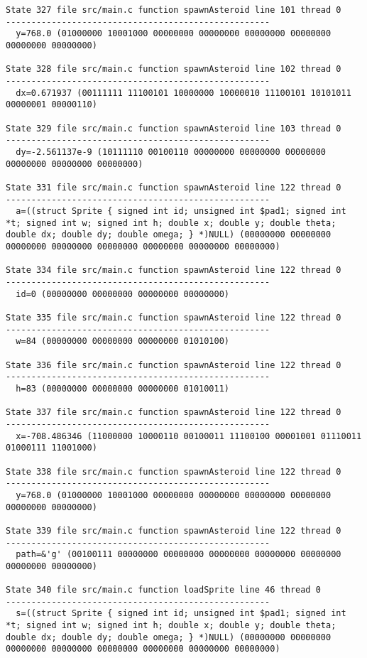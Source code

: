 \begin{verbatim}
State 327 file src/main.c function spawnAsteroid line 101 thread 0
----------------------------------------------------
  y=768.0 (01000000 10001000 00000000 00000000 00000000 00000000 00000000 00000000)

State 328 file src/main.c function spawnAsteroid line 102 thread 0
----------------------------------------------------
  dx=0.671937 (00111111 11100101 10000000 10000010 11100101 10101011 00000001 00000110)

State 329 file src/main.c function spawnAsteroid line 103 thread 0
----------------------------------------------------
  dy=-2.561137e-9 (10111110 00100110 00000000 00000000 00000000 00000000 00000000 00000000)

State 331 file src/main.c function spawnAsteroid line 122 thread 0
----------------------------------------------------
  a=((struct Sprite { signed int id; unsigned int $pad1; signed int *t; signed int w; signed int h; double x; double y; double theta; double dx; double dy; double omega; } *)NULL) (00000000 00000000 00000000 00000000 00000000 00000000 00000000 00000000)

State 334 file src/main.c function spawnAsteroid line 122 thread 0
----------------------------------------------------
  id=0 (00000000 00000000 00000000 00000000)

State 335 file src/main.c function spawnAsteroid line 122 thread 0
----------------------------------------------------
  w=84 (00000000 00000000 00000000 01010100)

State 336 file src/main.c function spawnAsteroid line 122 thread 0
----------------------------------------------------
  h=83 (00000000 00000000 00000000 01010011)

State 337 file src/main.c function spawnAsteroid line 122 thread 0
----------------------------------------------------
  x=-708.486346 (11000000 10000110 00100011 11100100 00001001 01110011 01000111 11001000)

State 338 file src/main.c function spawnAsteroid line 122 thread 0
----------------------------------------------------
  y=768.0 (01000000 10001000 00000000 00000000 00000000 00000000 00000000 00000000)

State 339 file src/main.c function spawnAsteroid line 122 thread 0
----------------------------------------------------
  path=&'g' (00100111 00000000 00000000 00000000 00000000 00000000 00000000 00000000)

State 340 file src/main.c function loadSprite line 46 thread 0
----------------------------------------------------
  s=((struct Sprite { signed int id; unsigned int $pad1; signed int *t; signed int w; signed int h; double x; double y; double theta; double dx; double dy; double omega; } *)NULL) (00000000 00000000 00000000 00000000 00000000 00000000 00000000 00000000)


\end{verbatim}
